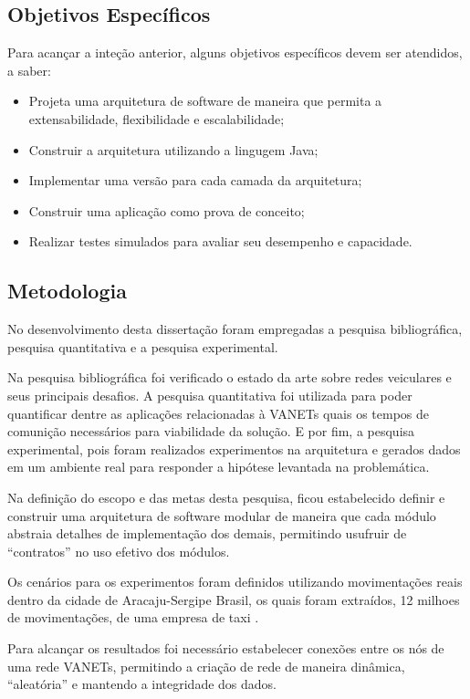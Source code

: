 \documentclass[
	12pt,				%
	oneside,			%
	a4paper,			%
	english,			%
	brazil				%
	]{abntex2ppgsi}
\begin{document}
\subsection{Objetivos Específicos}
Para acançar a inteção anterior, alguns objetivos específicos devem ser atendidos,  a saber: 
\begin{itemize}
	\item{Projeta uma arquitetura de software de maneira que permita a extensabilidade, flexibilidade e escalabilidade;}	
	\item{Construir a arquitetura utilizando a lingugem Java;}	
	\item{Implementar uma versão para cada camada da arquitetura;}	
	\item{Construir uma aplicação como prova de conceito;}	
	\item{Realizar testes simulados para avaliar seu desempenho e capacidade.}	
\end{itemize} 

\subsection{Metodologia}

No desenvolvimento desta dissertação foram empregadas a pesquisa bibliográfica, pesquisa quantitativa e a pesquisa experimental.

Na pesquisa bibliográfica foi verificado o estado da arte sobre redes veiculares e seus principais desafios. A pesquisa quantitativa foi utilizada para poder quantificar dentre as aplicações relacionadas à VANETs quais os tempos de comunição necessários para viabilidade da solução. E por fim, a pesquisa experimental, pois foram realizados experimentos na arquitetura e gerados dados em um ambiente real para responder a hipótese levantada na problemática.

Na definição do escopo e das metas desta pesquisa, ficou estabelecido definir e construir uma arquitetura de software modular de maneira que cada módulo abstraia detalhes de implementação dos demais, permitindo usufruir de ``contratos'' no uso efetivo dos módulos.

Os cenários para os experimentos foram definidos utilizando movimentações reais dentro da cidade de Aracaju-Sergipe Brasil, os quais foram extraídos, 12 milhoes de movimentações,  de uma empresa de taxi .

Para alcançar os resultados foi necessário estabelecer conexões entre os nós de uma rede VANETs, permitindo a criação de rede de maneira dinâmica, ``aleatória'' e mantendo a integridade dos dados.
\end{document}
